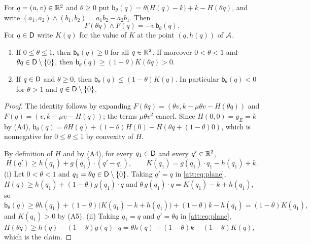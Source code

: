 \begin{proposition}\label{att:prop:scaling}
For $q=(u,v)\in\mathbb R^2$ and $\theta\ge0$ put $\mathsf b_\theta(q)=\theta\bigl(H(q)-k\bigr)+k-H(\theta q)$, and write $(a_1,a_2)\wedge(b_1,b_2)=a_1b_2-a_2b_1$. Then
\begin{equation}\label{att:eq:scaling}
F(\theta q)\wedge F(q)=-v\,\mathsf b_\theta(q).
\end{equation}
For $q\in\mathsf D$ write $K(q)$ for the value of $K$ at the point $(q,h(q))$ of $\mathcal A$.
\begin{enumerate}[label=\textup{(\roman*)}]
\item If $0\le\theta\le1$, then $\mathsf b_\theta(q)\ge0$ for all $q\in\mathbb R^2$. If moreover $0<\theta<1$ and $\theta q\in\mathsf D\setminus\{0\}$, then $\mathsf b_\theta(q)\ge(1-\theta)K(\theta q)>0$.
\item If $q\in\mathsf D$ and $\theta\ge0$, then $\mathsf b_\theta(q)\le(1-\theta)K(q)$. In particular $\mathsf b_\theta(q)<0$ for $\theta>1$ and $q\in\mathsf D\setminus\{0\}$.
\end{enumerate}
\end{proposition}
\begin{proof}
The identity follows by expanding $F(\theta q)=(\theta v,k-\mu\theta v-H(\theta q))$ and $F(q)=(v,k-\mu v-H(q))$; the terms $\mu\theta v^2$ cancel. Since $H(0,0)=y_E=k$ by (A4), $\mathsf b_\theta(q)=\theta H(q)+(1-\theta)H(0)-H(\theta q+(1-\theta)0)$, which is nonnegative for $0\le\theta\le1$ by convexity of $H$.

By definition of $H$ and by (A4), for every $q_1\in\mathsf D$ and every $q'\in\mathbb R^2$,
\begin{equation}\label{att:eq:plane}
H(q')\ge h(q_1)+g(q_1)\cdot(q'-q_1),\qquad K(q_1)=g(q_1)\cdot q_1-h(q_1)+k .
\end{equation}
(i) Let $0<\theta<1$ and $q_1=\theta q\in\mathsf D\setminus\{0\}$. Taking $q'=q$ in \eqref{att:eq:plane}, $H(q)\ge h(q_1)+(1-\theta)g(q_1)\cdot q$ and $\theta\,g(q_1)\cdot q=K(q_1)-k+h(q_1)$, so
\[
\mathsf b_\theta(q)\ge\theta h(q_1)+(1-\theta)\bigl(K(q_1)-k+h(q_1)\bigr)+(1-\theta)k-h(q_1)=(1-\theta)K(q_1),
\]
and $K(q_1)>0$ by (A5).
(ii) Taking $q_1=q$ and $q'=\theta q$ in \eqref{att:eq:plane}, $H(\theta q)\ge h(q)-(1-\theta)g(q)\cdot q=\theta h(q)+(1-\theta)k-(1-\theta)K(q)$, which is the claim.
\end{proof}
